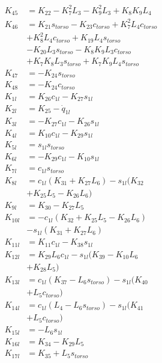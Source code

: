 \begin{multicols}{2}
\begin{align}
K_{45} &= K_{22} - K_{7}^2L_3 - K_{9}^2L_3 + K_{8}K_{9}L_4 \nonumber \\
K_{46} &= K_{21}s_{torso} - K_{23}c_{torso} + K_{7}^2L_4c_{torso}  \nonumber \\
&+ K_{8}^2L_4c_{torso} + K_{19}L_4s_{torso}  \nonumber \\
&- K_{20}L_3s_{torso} - K_{8}K_{9}L_3c_{torso}  \nonumber \\
&+ K_{7}K_{8}L_3s_{torso} + K_{7}K_{9}L_4s_{torso} \nonumber \\
K_{47} &= -K_{24}s_{torso} \nonumber \\
K_{48} &= -K_{24}c_{torso} \nonumber \\
K_{1l} &= K_{26}c_{1l} - K_{27}s_{1l} \nonumber \\
K_{2l} &= K_{25} - \dot{q}_{1l} \nonumber \\
K_{3l} &= - K_{27}c_{1l} - K_{26}s_{1l} \nonumber \\
K_{4l} &= K_{10}c_{1l} - K_{29}s_{1l} \nonumber \\
K_{5l} &= s_{1l}s_{torso} \nonumber \\
K_{6l} &= - K_{29}c_{1l} - K_{10}s_{1l} \nonumber \\
K_{7l} &= c_{1l}s_{torso} \nonumber \\
K_{8l} &= c_{1l}(K_{31} + K_{27}L_6) - s_{1l}(K_{32}  \nonumber \\
&+ K_{25}L_5 - K_{26}L_6) \nonumber \\
K_{9l} &= K_{30} - K_{27}L_5 \nonumber \\
K_{10l} &= - c_{1l}(K_{32} + K_{25}L_5 - K_{26}L_6)  \nonumber \\
&- s_{1l}(K_{31} + K_{27}L_6) \nonumber \\
K_{11l} &= K_{11}c_{1l} - K_{38}s_{1l} \nonumber \\
K_{12l} &= K_{29}L_6c_{1l} - s_{1l}(K_{39} - K_{10}L_6  \nonumber \\
&+ K_{28}L_5) \nonumber \\
K_{13l} &= c_{1l}(K_{37} - L_6s_{torso}) - s_{1l}(K_{40}  \nonumber \\
&+ L_5c_{torso}) \nonumber \\
K_{14l} &= c_{1l}(L_4 - L_6s_{torso}) - s_{1l}(K_{41}  \nonumber \\
&+ L_5c_{torso}) \nonumber \\
K_{15l} &= -L_6s_{1l} \nonumber \\
K_{16l} &= K_{34} - K_{29}L_5 \nonumber \\
K_{17l} &= K_{35} + L_5s_{torso} \nonumber \\

\end{align}
\end{multicols}
